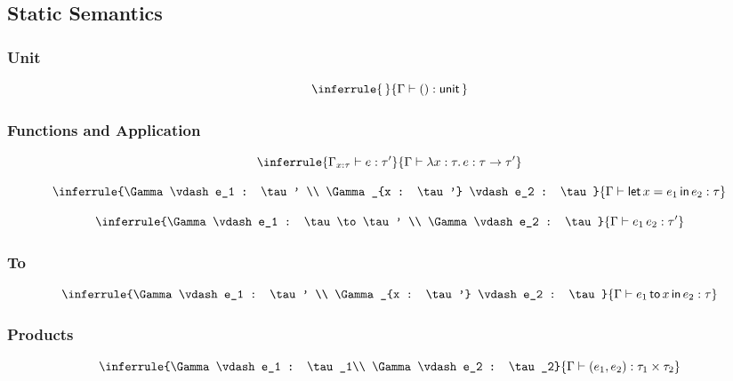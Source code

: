 \documentclass{article}
\newcommand{\unit}{\mathsf{unit\,}}
\newcommand{\letc}{\mathsf{let \,}}
\newcommand{\inc}{\mathsf{\, in \,}}
\newcommand{\toc}{\mathsf{\, to \,}}
\newcommand{\1}{\mathsf{\,\#1\,}}
\newcommand{\2}{\mathsf{\,\#2\,}}
\begin{document}
\subsection{Static Semantics}
\begin{multicols}{2}
\subsubsection*{Unit}
\begin{equation*}
	\inferrule{\,}{\Gamma \vdash () : \unit}
\end{equation*}

\subsubsection*{Functions and Application}
\begin{equation*}
	\inferrule{\Gamma_{x : \tau} \vdash e : \tau'}
	{\Gamma \vdash \lambda x : \tau.\, e : \tau \to \tau'}
\end{equation*}

\begin{equation*}
	\inferrule{\Gamma \vdash e_1 : \tau' \\ \Gamma_{x : \tau'} \vdash e_2 : \tau}
	{\Gamma \vdash \letc x = e_1 \inc e_2 : \tau}
\end{equation*}

\begin{equation*}
	\inferrule{\Gamma \vdash e_1 : \tau \to \tau' \\ \Gamma \vdash e_2 : \tau}
	{\Gamma \vdash e_1\, e_2 : \tau'}
\end{equation*}

\subsubsection*{To}
\begin{equation*}
	\inferrule{\Gamma \vdash e_1 : \tau' \\ \Gamma_{x : \tau'} \vdash e_2 : \tau}
	{\Gamma \vdash e_1 \toc x \inc e_2 : \tau}
\end{equation*}

\columnbreak
\subsubsection*{Products}
\begin{equation*}
	\inferrule{\Gamma \vdash e_1 : \tau_1\\ \Gamma \vdash e_2 : \tau_2}
	{\Gamma \vdash (e_1, e_2) : \tau_1 \times \tau_2}
\end{equation*}


\end{multicols}
\end{document}
